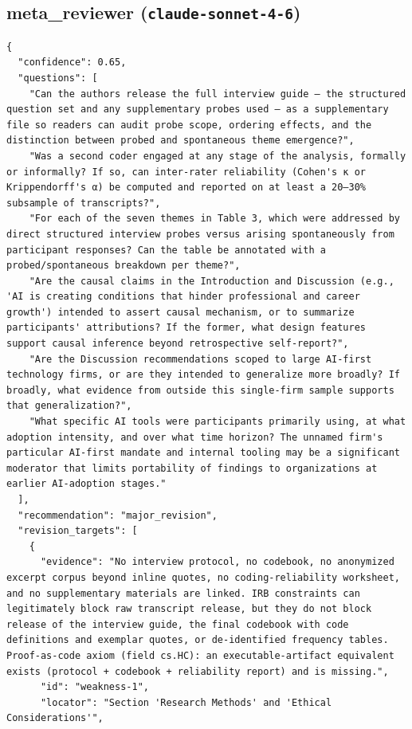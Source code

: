 \documentclass[11pt]{article}
\begin{document}
\subsection*{meta_reviewer (\texttt{claude-sonnet-4-6})}
\begin{verbatim}
{
  "confidence": 0.65,
  "questions": [
    "Can the authors release the full interview guide — the structured question set and any supplementary probes used — as a supplementary file so readers can audit probe scope, ordering effects, and the distinction between probed and spontaneous theme emergence?",
    "Was a second coder engaged at any stage of the analysis, formally or informally? If so, can inter-rater reliability (Cohen's κ or Krippendorff's α) be computed and reported on at least a 20–30% subsample of transcripts?",
    "For each of the seven themes in Table 3, which were addressed by direct structured interview probes versus arising spontaneously from participant responses? Can the table be annotated with a probed/spontaneous breakdown per theme?",
    "Are the causal claims in the Introduction and Discussion (e.g., 'AI is creating conditions that hinder professional and career growth') intended to assert causal mechanism, or to summarize participants' attributions? If the former, what design features support causal inference beyond retrospective self-report?",
    "Are the Discussion recommendations scoped to large AI-first technology firms, or are they intended to generalize more broadly? If broadly, what evidence from outside this single-firm sample supports that generalization?",
    "What specific AI tools were participants primarily using, at what adoption intensity, and over what time horizon? The unnamed firm's particular AI-first mandate and internal tooling may be a significant moderator that limits portability of findings to organizations at earlier AI-adoption stages."
  ],
  "recommendation": "major_revision",
  "revision_targets": [
    {
      "evidence": "No interview protocol, no codebook, no anonymized excerpt corpus beyond inline quotes, no coding-reliability worksheet, and no supplementary materials are linked. IRB constraints can legitimately block raw transcript release, but they do not block release of the interview guide, the final codebook with code definitions and exemplar quotes, or de-identified frequency tables. Proof-as-code axiom (field cs.HC): an executable-artifact equivalent exists (protocol + codebook + reliability report) and is missing.",
      "id": "weakness-1",
      "locator": "Section 'Research Methods' and 'Ethical Considerations'",

\end{verbatim}
\end{document}
